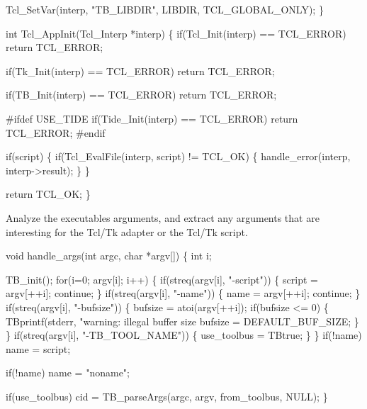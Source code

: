   Tcl_SetVar(interp, "TB_LIBDIR", LIBDIR, TCL_GLOBAL_ONLY);
\}
\nwendcode{}\nwdocspar



\nwenddocs{}\endmoddef\let\nwnotused=\nwoutput{}
int Tcl_AppInit(Tcl_Interp *interp)
\{
  if(Tcl_Init(interp) == TCL_ERROR)
    return TCL_ERROR;

  if(Tk_Init(interp) == TCL_ERROR)
    return TCL_ERROR;

  if(TB_Init(interp) == TCL_ERROR)
    return TCL_ERROR;

#ifdef USE_TIDE
  if(Tide_Init(interp) == TCL_ERROR)
    return TCL_ERROR;
#endif

  if(script) \{
    if(Tcl_EvalFile(interp, script) != TCL_OK) \{
      handle_error(interp, interp->result);
    \}
  \}

  return TCL_OK;
\}
\nwendcode{}\nwdocspar


Analyze the executables arguments, and extract any arguments
that are interesting for the Tcl/Tk adapter or the Tcl/Tk script.

\nwenddocs{}\endmoddef\let\nwnotused=\nwoutput{}
void handle_args(int argc, char *argv[])
\{
  int i;

  TB_init();
  for(i=0; argv[i]; i++) \{
    if(streq(argv[i], "-script")) \{
      script = argv[++i];
      continue;
    \}
    if(streq(argv[i], "-name")) \{
      name = argv[++i];
      continue;
    \}
    if(streq(argv[i], "-bufsize")) \{
      bufsize = atoi(argv[++i]);
      if(bufsize <= 0) \{
        TBprintf(stderr, "warning: illegal buffer size %
        bufsize = DEFAULT_BUF_SIZE;
      \}
    \}
    if(streq(argv[i], "-TB_TOOL_NAME")) \{
      use_toolbus = TBtrue;
    \}
  \}
  if(!name)
    name = script;

  if(!name)
    name = "noname";

  if(use_toolbus)
    cid = TB_parseArgs(argc, argv, from_toolbus, NULL);
\}
\nwendcode{}\nwdocspar

